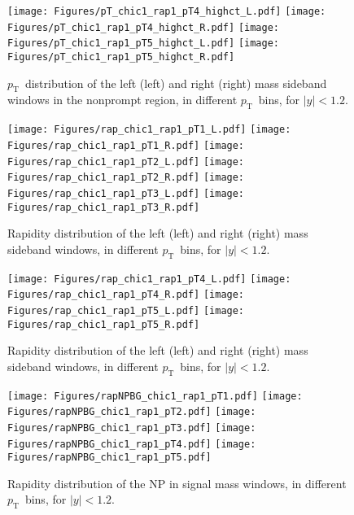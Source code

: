 \documentclass[12pt]{article}
\newcommand{\pt}{$p_{\mathrm{T}}$}
\begin{document}
\begin{figure}[htbp]
\centering
\texttt{[image: Figures/pT\_chic1\_rap1\_pT4\_highct\_L.pdf]}
\texttt{[image: Figures/pT\_chic1\_rap1\_pT4\_highct\_R.pdf]}
\texttt{[image: Figures/pT\_chic1\_rap1\_pT5\_highct\_L.pdf]}
\texttt{[image: Figures/pT\_chic1\_rap1\_pT5\_highct\_R.pdf]}
\caption{\pt\ distribution of the left (left) and
  right (right) mass sideband windows in the nonprompt region, in
  different
  \pt\ bins, for $|y| < 1.2$.}
\end{figure}
\clearpage

\begin{figure}[htbp]
\centering
\texttt{[image: Figures/rap\_chic1\_rap1\_pT1\_L.pdf]}
\texttt{[image: Figures/rap\_chic1\_rap1\_pT1\_R.pdf]}
\texttt{[image: Figures/rap\_chic1\_rap1\_pT2\_L.pdf]}
\texttt{[image: Figures/rap\_chic1\_rap1\_pT2\_R.pdf]}
\texttt{[image: Figures/rap\_chic1\_rap1\_pT3\_L.pdf]}
\texttt{[image: Figures/rap\_chic1\_rap1\_pT3\_R.pdf]}
\caption{Rapidity distribution of the left (left) and
  right (right) mass sideband windows, in different
  \pt\ bins, for $|y| < 1.2$.}
\end{figure}
\clearpage

\begin{figure}[htbp]
\centering
\texttt{[image: Figures/rap\_chic1\_rap1\_pT4\_L.pdf]}
\texttt{[image: Figures/rap\_chic1\_rap1\_pT4\_R.pdf]}
\texttt{[image: Figures/rap\_chic1\_rap1\_pT5\_L.pdf]}
\texttt{[image: Figures/rap\_chic1\_rap1\_pT5\_R.pdf]}
\caption{Rapidity distribution of the left (left) and
  right (right) mass sideband windows, in different
  \pt\ bins, for $|y| < 1.2$.}
\end{figure}
\clearpage

\begin{figure}[htbp]
\centering
\texttt{[image: Figures/rapNPBG\_chic1\_rap1\_pT1.pdf]}
\texttt{[image: Figures/rapNPBG\_chic1\_rap1\_pT2.pdf]}
\texttt{[image: Figures/rapNPBG\_chic1\_rap1\_pT3.pdf]}
\texttt{[image: Figures/rapNPBG\_chic1\_rap1\_pT4.pdf]}
\texttt{[image: Figures/rapNPBG\_chic1\_rap1\_pT5.pdf]}
\caption{Rapidity distribution of the NP in signal mass
  windows, in different \pt\ bins, for $|y| < 1.2$.}
\end{figure}
\clearpage
\end{document}
